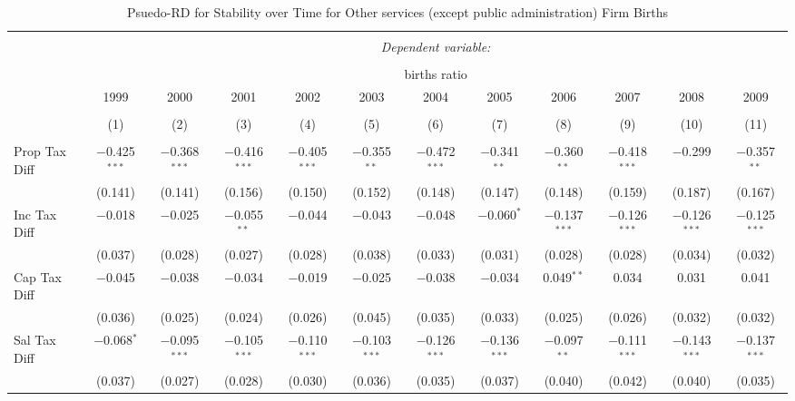 
\begin{table}[!htbp] \centering 
  \caption{Psuedo-RD for Stability over Time for  Other services (except public administration) Firm Births} 
  \label{81year} 
\small 
\begin{tabular}{@{\extracolsep{5pt}}lccccccccccc} 
\\[-1.8ex]\hline 
\hline \\[-1.8ex] 
 & \multicolumn{11}{c}{\textit{Dependent variable:}} \\ 
\cline{2-12} 
\\[-1.8ex] & \multicolumn{11}{c}{births ratio} \\ 
 & 1999 & 2000 & 2001 & 2002 & 2003 & 2004 & 2005 & 2006 & 2007 & 2008 & 2009 \\ 
\\[-1.8ex] & (1) & (2) & (3) & (4) & (5) & (6) & (7) & (8) & (9) & (10) & (11)\\ 
\hline \\[-1.8ex] 
 Prop Tax Diff & $-$0.425$^{***}$ & $-$0.368$^{***}$ & $-$0.416$^{***}$ & $-$0.405$^{***}$ & $-$0.355$^{**}$ & $-$0.472$^{***}$ & $-$0.341$^{**}$ & $-$0.360$^{**}$ & $-$0.418$^{***}$ & $-$0.299 & $-$0.357$^{**}$ \\ 
  & (0.141) & (0.141) & (0.156) & (0.150) & (0.152) & (0.148) & (0.147) & (0.148) & (0.159) & (0.187) & (0.167) \\ 
  Inc Tax Diff & $-$0.018 & $-$0.025 & $-$0.055$^{**}$ & $-$0.044 & $-$0.043 & $-$0.048 & $-$0.060$^{*}$ & $-$0.137$^{***}$ & $-$0.126$^{***}$ & $-$0.126$^{***}$ & $-$0.125$^{***}$ \\ 
  & (0.037) & (0.028) & (0.027) & (0.028) & (0.038) & (0.033) & (0.031) & (0.028) & (0.028) & (0.034) & (0.032) \\ 
  Cap Tax Diff & $-$0.045 & $-$0.038 & $-$0.034 & $-$0.019 & $-$0.025 & $-$0.038 & $-$0.034 & 0.049$^{**}$ & 0.034 & 0.031 & 0.041 \\ 
  & (0.036) & (0.025) & (0.024) & (0.026) & (0.045) & (0.035) & (0.033) & (0.025) & (0.026) & (0.032) & (0.032) \\ 
  Sal Tax Diff & $-$0.068$^{*}$ & $-$0.095$^{***}$ & $-$0.105$^{***}$ & $-$0.110$^{***}$ & $-$0.103$^{***}$ & $-$0.126$^{***}$ & $-$0.136$^{***}$ & $-$0.097$^{**}$ & $-$0.111$^{***}$ & $-$0.143$^{***}$ & $-$0.137$^{***}$ \\ 
  & (0.037) & (0.027) & (0.028) & (0.030) & (0.036) & (0.035) & (0.037) & (0.040) & (0.042) & (0.040) & (0.035) \\ 

\end{tabular}
\end{table}
